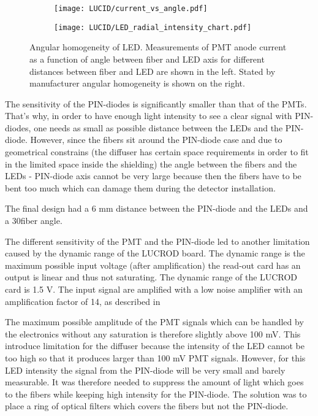 \begin{figure}
\begin{subfigure}{.46\textwidth}
  \centering
  \texttt{[image: LUCID/current\_vs\_angle.pdf]}
\end{subfigure}
\begin{subfigure}{.51\textwidth}
  \centering
  \texttt{[image: LUCID/LED\_radial\_intensity\_chart.pdf]}
\end{subfigure}

\caption{Angular homogeneity of LED. Measurements of PMT anode current as a function of angle between fiber and LED axis for different distances between fiber and LED are shown in the left.
	 Stated by manufacturer angular homogeneity is shown on the right.}
\label{fig:AngularDistributionOfLED}
\end{figure}

The sensitivity of the PIN-diodes is significantly smaller than that of the PMTs.
That's why, in order to have enough light intensity to see a clear signal with PIN-diodes, one needs as small as possible
distance between the LEDs and the PIN-diode. However, since the fibers sit around the PIN-diode case and due to geometrical constrains 
(the diffuser has certain space requirements in order to fit in the limited space inside the shielding) 
the angle between the fibers and the LEDs - PIN-diode axis cannot be very large because then
the fibers have to be bent too much which can damage them during the detector installation.

The final design had a 6 mm distance between the PIN-diode and the LEDs and a 30\degree fiber angle.

The different sensitivity of the PMT and the PIN-diode led to another limitation caused by the dynamic range of the LUCROD board.
The dynamic range is the maximum possible input voltage (after amplification) the read-out card has an output is linear and thus not saturating.
The dynamic range of the LUCROD card is 1.5 V. 
The input signal are amplified with a low noise amplifier with an amplification factor of 14, as described in  

The maximum possible amplitude of the PMT signals which can be handled by the electronics without any saturation is therefore slightly above 100 mV.
This introduce limitation for the diffuser because the intensity of the LED cannot be too high so that it produces larger than 100 mV PMT signals.
However, for this LED intensity the signal from the PIN-diode will be very small and barely measurable.
It was therefore needed to suppress the amount of light which goes to the fibers while keeping high intensity for the PIN-diode.
The solution was to place a ring of optical filters which covers the fibers but not the PIN-diode.

